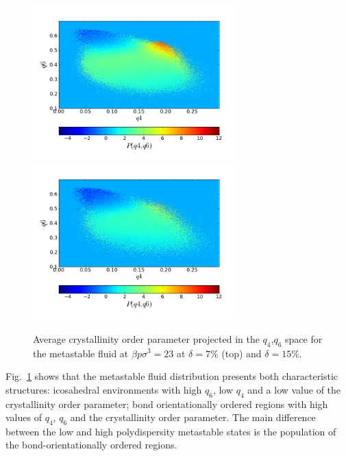 \documentclass[twocolumn,superscriptaddress]{revtex4-1}
\begin{document}
\begin{figure}
 \centering
 \includegraphics[width=8cm, bb=0 0 576 432]{./figures/mesh_q4q6_007.png}
 \includegraphics[width=8cm, bb=0 0 576 432]{./figures/mesh_q4q6_015.png}
 \caption{Average crystallinity order parameter projected in the $q_4$,$q_6$ space for
the metastable fluid at $\beta p\sigma^3=23$ at $\delta=7\%$ (top) and $\delta=15\%$.}
 \label{fig:q4q6}
\end{figure}


Fig.~\ref{fig:q4q6} shows that the metastable fluid distribution presents both characteristic
structures: icosahedral environments with high $q_6$, low $q_4$ and a low value of the
crystallinity order parameter; bond orientationally ordered regions with high values of
$q_4$, $q_6$ and the crystallinity order parameter. The main difference between the low and
high polydispersity metastable states is the population of the bond-orientationally ordered regions.
\end{document}

